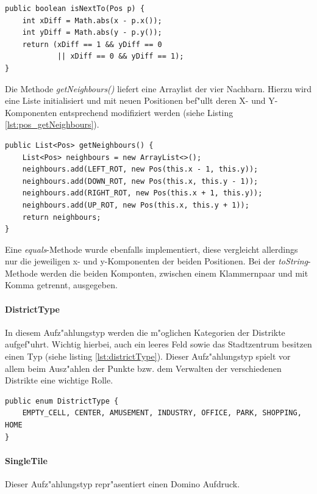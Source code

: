 \begin{lstlisting}[float,style=CodeHighlighting,caption=Pos - isNextTo(),label=lst:pos_isNextTo]
public boolean isNextTo(Pos p) {
    int xDiff = Math.abs(x - p.x());
	int yDiff = Math.abs(y - p.y());
	return (xDiff == 1 && yDiff == 0
            || xDiff == 0 && yDiff == 1);
}
\end{lstlisting}

Die Methode \emph{getNeighbours()} liefert eine Arraylist der vier Nachbarn. Hierzu wird eine Liste initialisiert und mit neuen Positionen bef"ullt deren X- und Y-Komponenten entsprechend modifiziert werden (siehe Listing \ref{lst:pos_getNeighbours}). 

\begin{lstlisting}[float,style=CodeHighlighting,caption=Pos - getNeighbours(),label=lst:pos_getNeighbours]
public List<Pos> getNeighbours() {
    List<Pos> neighbours = new ArrayList<>();
    neighbours.add(LEFT_ROT, new Pos(this.x - 1, this.y));
    neighbours.add(DOWN_ROT, new Pos(this.x, this.y - 1));
    neighbours.add(RIGHT_ROT, new Pos(this.x + 1, this.y));
    neighbours.add(UP_ROT, new Pos(this.x, this.y + 1));
    return neighbours;
}
\end{lstlisting}


Eine \emph{equals}-Methode wurde ebenfalls implementiert, diese vergleicht allerdings nur die jeweiligen x- und y-Komponenten der beiden Positionen. Bei der \emph{toString}-Methode werden die beiden Komponten, zwischen einem Klammernpaar und mit Komma getrennt, ausgegeben. 

\paragraph{DistrictType}
\label{par:districtType}
In diesem Aufz"ahlungstyp werden die m"oglichen Kategorien der Distrikte aufgef"uhrt. Wichtig hierbei, auch ein leeres Feld sowie das Stadtzentrum besitzen einen Typ (siehe listing \ref{lst:districtType}). 
Dieser Aufz"ahlungstyp spielt vor allem beim Ausz"ahlen der Punkte bzw. dem Verwalten der verschiedenen Distrikte eine wichtige Rolle. 

\begin{lstlisting}[float,style=CodeHighlighting,caption=DistrictType,label=lst:districtType]
public enum DistrictType {
    EMPTY_CELL, CENTER, AMUSEMENT, INDUSTRY, OFFICE, PARK, SHOPPING, HOME
}
\end{lstlisting}


\paragraph{SingleTile}
\label{par:singleTile}
Dieser Aufz"ahlungstyp repr"asentiert einen Domino Aufdruck. 

